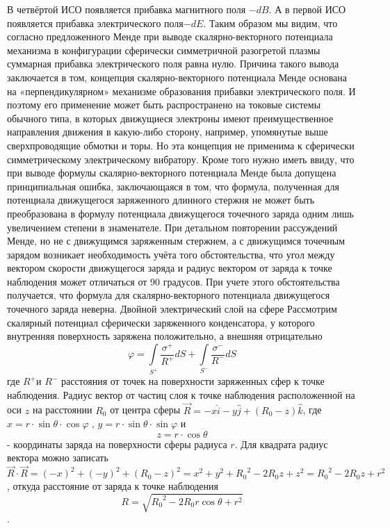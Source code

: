 ﻿\documentclass{article}
\begin{document}
В четвёртой ИСО появляется прибавка магнитного поля $-dB$. А в первой ИСО появляется прибавка электрического поля$-dE$.
Таким образом мы видим, что согласно предложенного Менде при выводе скалярно-векторного потенциала механизма в конфигурации сферически симметричной разогретой плазмы суммарная прибавка электрического поля равна нулю.
Причина такого вывода заключается в том, концепция скалярно-векторного потенциала Менде основана на «перпендикулярном» механизме образования прибавки электрического поля. И поэтому его применение может быть распространено на токовые системы обычного типа, в которых движущиеся электроны имеют преимущественное направления движения в какую-либо сторону, например, упомянутые выше сверхпроводящие обмотки и торы. Но эта концепция не применима к сферически симметрическому электрическому вибратору.
Кроме того нужно иметь ввиду, что при выводе формулы скалярно-векторного потенциала Менде была допущена принципиальная ошибка, заключающаяся в том, что формула, полученная для потенциала движущегося заряженного длинного стержня не может быть преобразована в формулу потенциала движущегося точечного заряда одним лишь увеличением степени    в знаменателе. При детальном повторении рассуждений Менде, но не с движущимся заряженным стержнем, а с движущимся точечным зарядом возникает необходимость учёта того обстоятельства, что угол между вектором скорости движущегося заряда и радиус вектором от заряда к точке наблюдения может отличаться от 90 градусов. При учете этого обстоятельства получается, что формула для скалярно-векторного потенциала движущегося точечного заряда неверна. 
Двойной электрический слой на сфере
Рассмотрим скалярный потенциал сферически заряженного конденсатора, у которого внутренняя поверхность заряжена положительно, а внешняя отрицательно
	\[\varphi =\int\limits_{{{S}^{+}}}{\frac{{{\sigma }^{+}}}{{{R}^{+}}}dS+}\int\limits_{{{S}^{-}}}{\frac{{{\sigma }^{-}}}{{{R}^{-}}}dS}\] 	
где ${{R}^{+}}$и ${{R}^{-}}$ расстояния от точек на поверхности заряженных сфер к точке наблюдения.
Радиус вектор от частиц слоя к точке наблюдения расположенной на оси $z$ на расстоянии ${{R}_{0}}$ от центра сферы $\overrightarrow{R}=-x\widehat{i}-y\widehat{j}+\left( {{R}_{0}}-z \right)\widehat{k}$, где $x=r\cdot \sin \theta \cdot \cos \varphi $ , $y=r\cdot \sin \theta \cdot \sin \varphi $ и \[z=r\cdot \cos \theta \] - координаты заряда на поверхности сферы радиуса $r$. Для квадрата радиус вектора можно записать $\overrightarrow{R}\cdot \overrightarrow{R}={{\left( -x \right)}^{2}}+{{\left( -y \right)}^{2}}+{{\left( {{R}_{0}}-z \right)}^{2}}={{x}^{2}}+{{y}^{2}}+{{R}_{0}}^{2}-2{{R}_{0}}z+{{z}^{2}}={{R}_{0}}^{2}-2{{R}_{0}}z+{{r}^{2}}$, откуда расстояние от заряда к точке наблюдения \[R=\sqrt{{{R}_{0}}^{2}-2{{R}_{0}}r\cos \theta +{{r}^{2}}}\].
\end{document}
